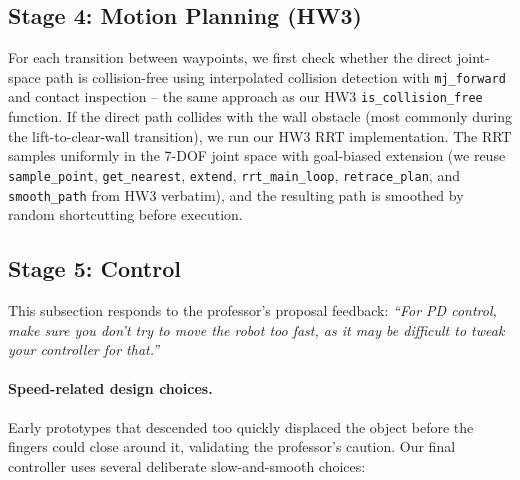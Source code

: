 \documentclass[11pt]{article}
\begin{document}
\subsection{Stage 4: Motion Planning (HW3)}

For each transition between waypoints, we first check whether the
direct joint-space path is collision-free using interpolated
collision detection with \texttt{mj\_forward} and contact inspection --
the same approach as our HW3 \texttt{is\_collision\_free} function. If
the direct path collides with the wall obstacle (most commonly during
the lift-to-clear-wall transition), we run our HW3 RRT implementation.
The RRT samples uniformly in the 7-DOF joint space with goal-biased
extension (we reuse \texttt{sample\_point}, \texttt{get\_nearest},
\texttt{extend}, \texttt{rrt\_main\_loop}, \texttt{retrace\_plan}, and
\texttt{smooth\_path} from HW3 verbatim), and the resulting path is
smoothed by random shortcutting before execution.

\subsection{Stage 5: Control}

This subsection responds to the professor's proposal feedback:
\emph{``For PD control, make sure you don't try to move the robot too
fast, as it may be difficult to tweak your controller for that.''}

\paragraph{Speed-related design choices.}
Early prototypes that descended too quickly displaced the object before
the fingers could close around it, validating the professor's caution.
Our final controller uses several deliberate slow-and-smooth choices:
\end{document}
